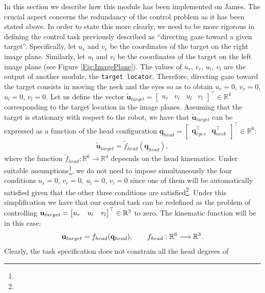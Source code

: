 In this section we describe how this module has been implemented on James. 
The crucial aspect concerns the redundancy of the control problem as it 
has been stated above. In order to state this more clearly, we need to 
be more rigorous in defining the control task previously described as 
``directing gaze toward a given target''. Specifically, let $u_r$ and 
$v_r$ be the coordinates of the target on the right image plane. 
Similarly, let $u_l$ and $v_l$ be the coordinates of the target on the 
left image plane (see Figure \ref{Fig:ImagePlane}). The values of $u_r$, 
$v_r$, $u_l$, $v_l$ are the output of another module, the {\tt target 
locator}. Therefore, directing gaze toward the target consists in moving 
the neck and the eyes so as to obtain $u_r=0$, $v_r=0$, $u_l=0$, $v_l=0$. 
Let us define the vector 
$\tilde {\mathbf u}_{target}= \begin{bmatrix} u_r & v_r & u_l & v_l 
\end{bmatrix}^\top \in \mathbb R^4$ corresponding to the 
target location in the image planes. Assuming that the target is stationary 
with respect to the robot, we have that $\tilde {\mathbf u}_{target}$ 
can be expressed as a function of the head configuration 
$\mathbf q_{head} = \begin{bmatrix} \mathbf q_{eyes}^\top & \mathbf q_{neck}^\top \end{bmatrix}^\top \in \mathbb R^6$:
\begin{eqnarray*}
\tilde {\mathbf u}_{target} = \tilde f_{head} (\mathbf q_{head}),
\end{eqnarray*}
where the function $\tilde f_{head} : \mathbb R^6 \longrightarrow \mathbb R^4$ 
depeends on the head kinematics. Under suitable 
assumptions\footnote{}, we do not need to impose simultaneously 
the four conditions $u_r=0$, $v_r=0$, $u_l=0$, $v_l=0$ since one of them will be 
automatically satisfied given that the other three conditions are 
satisfied\footnote{}. Under this simplification we have that 
our control task can be redefined as the problem of controlling 
$\mathbf{u}_{target} = \begin{bmatrix} u_r & u_l & v_l \end{bmatrix}^\top \in \mathbb R^3$ 
to zero. The kinematic function will be in this case:
\begin{eqnarray*}
\mathbf{u}_{target} = f_{head} (\mathbf q_{head}), \qquad f_{head} : \mathbb R^6 \longrightarrow \mathbb R^3.
\end{eqnarray*}
Clearly, the task specification does not constrain all the head degrees of 
